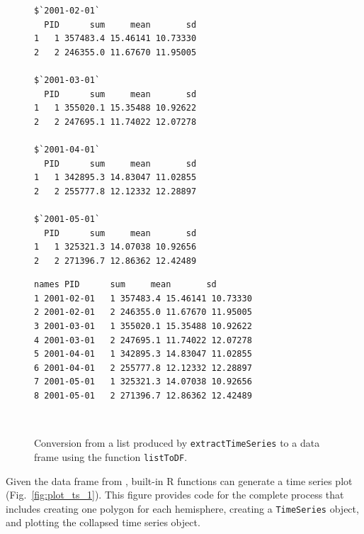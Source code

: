 \documentclass[11pt]{report}
\begin{document}
\begin{figure}[!h]
  \centering
  \begin{minipage}[b]{.35\linewidth}
\begin{Verbatim}[fontsize=\small,samepage=true]
$`2001-02-01`
  PID      sum     mean       sd
1   1 357483.4 15.46141 10.73330
2   2 246355.0 11.67670 11.95005

$`2001-03-01`
  PID      sum     mean       sd
1   1 355020.1 15.35488 10.92622
2   2 247695.1 11.74022 12.07278

$`2001-04-01`
  PID      sum     mean       sd
1   1 342895.3 14.83047 11.02855
2   2 255777.8 12.12332 12.28897

$`2001-05-01`
  PID      sum     mean       sd
1   1 325321.3 14.07038 10.92656
2   2 271396.7 12.86362 12.42489
\end{Verbatim}
  \end{minipage}\hspace{5mm}
  \begin{minipage}[b]{0.45\linewidth}
\begin{Verbatim}[fontsize=\small,samepage=true]
       names PID      sum     mean       sd
1 2001-02-01   1 357483.4 15.46141 10.73330
2 2001-02-01   2 246355.0 11.67670 11.95005
3 2001-03-01   1 355020.1 15.35488 10.92622
4 2001-03-01   2 247695.1 11.74022 12.07278
5 2001-04-01   1 342895.3 14.83047 11.02855
6 2001-04-01   2 255777.8 12.12332 12.28897
7 2001-05-01   1 325321.3 14.07038 10.92656
8 2001-05-01   2 271396.7 12.86362 12.42489
\end{Verbatim}
  \end{minipage}\\
  \begin{minipage}[t]{0.35\linewidth}
  \end{minipage}\hspace{5mm}
  \begin{minipage}[t]{0.45\linewidth}
  \end{minipage}
  \caption{Conversion from a list produced by \texttt{extractTimeSeries} to a data frame using the function \texttt{listToDF}.}
  \label{fig:listToDF}
\end{figure}

Given the data frame from , built-in R functions can generate a time series plot (Fig.~\ref{fig:plot_ts_1}).
This figure provides code for the complete process that includes creating one polygon for each hemisphere, creating a \lstinline{TimeSeries} object, and plotting the collapsed time series object.
\end{document}
